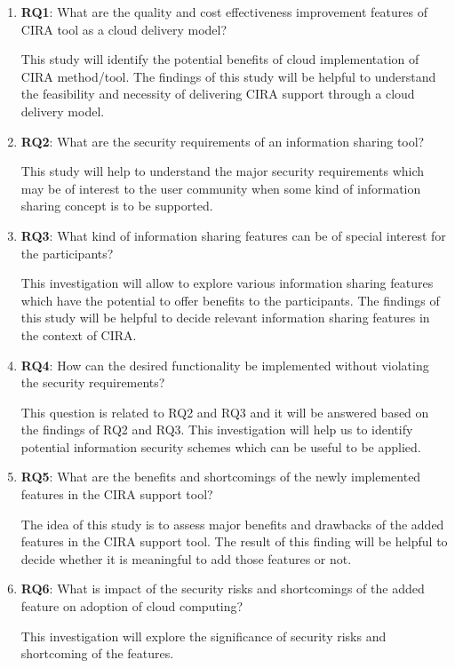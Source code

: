 \documentclass[a4paper,twoside,10pt]{report}
\begin{document}
\begin{enumerate}

\item \textbf{RQ1}: What are the quality and cost effectiveness improvement features of CIRA tool as a cloud delivery model?

This study will identify the potential benefits of cloud implementation of CIRA method/tool. The findings of this study will be helpful to understand the feasibility and necessity of delivering CIRA support through a cloud delivery model.

\item \textbf{RQ2}: What are the security requirements of an information sharing tool?

This study will help to understand the major security requirements which may be of interest to the user community when some kind of information sharing concept is to be supported. 

\item \textbf{RQ3}: What kind of information sharing features can be of special interest for the participants?

This investigation will allow to explore various information sharing features which have the potential to offer benefits to the participants. The findings of this study will be helpful to decide relevant information sharing features in the context of CIRA.

\item \textbf{RQ4}: How can the desired functionality be implemented without violating the security requirements?

This question is related to RQ2 and RQ3 and it will be answered based on the findings of RQ2 and RQ3. This investigation will help us to identify potential information security schemes which can be useful to be applied.

\item \textbf{RQ5}: What are the benefits and shortcomings of the newly implemented features in the CIRA support tool?

The idea of this study is to assess major benefits and drawbacks of the added features in the CIRA support tool. The result of this finding will be helpful to decide whether it is meaningful to add those features or not.

\item \textbf{RQ6}: What is impact of the security risks and shortcomings of the added feature on adoption of cloud computing?

This investigation will explore the significance of security risks and shortcoming of the features.

\end{enumerate}
\end{document}
